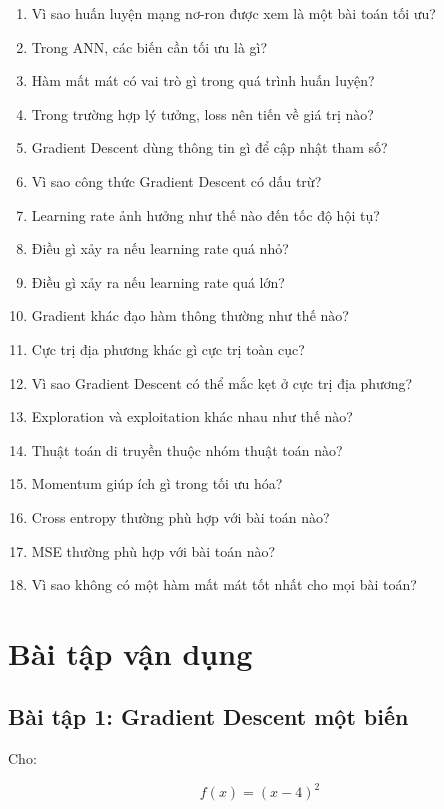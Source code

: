 \documentclass[12pt,a4paper]{report}
\begin{document}
\begin{enumerate}
    \item Vì sao huấn luyện mạng nơ-ron được xem là một bài toán tối ưu?
    \item Trong ANN, các biến cần tối ưu là gì?
    \item Hàm mất mát có vai trò gì trong quá trình huấn luyện?
    \item Trong trường hợp lý tưởng, loss nên tiến về giá trị nào?
    \item Gradient Descent dùng thông tin gì để cập nhật tham số?
    \item Vì sao công thức Gradient Descent có dấu trừ?
    \item Learning rate ảnh hưởng như thế nào đến tốc độ hội tụ?
    \item Điều gì xảy ra nếu learning rate quá nhỏ?
    \item Điều gì xảy ra nếu learning rate quá lớn?
    \item Gradient khác đạo hàm thông thường như thế nào?
    \item Cực trị địa phương khác gì cực trị toàn cục?
    \item Vì sao Gradient Descent có thể mắc kẹt ở cực trị địa phương?
    \item Exploration và exploitation khác nhau như thế nào?
    \item Thuật toán di truyền thuộc nhóm thuật toán nào?
    \item Momentum giúp ích gì trong tối ưu hóa?
    \item Cross entropy thường phù hợp với bài toán nào?
    \item MSE thường phù hợp với bài toán nào?
    \item Vì sao không có một hàm mất mát tốt nhất cho mọi bài toán?
\end{enumerate}

\chapter{Bài tập vận dụng}

\section*{Bài tập 1: Gradient Descent một biến}

Cho:

\[
    f(x) = (x-4)^2
\]
\end{document}
